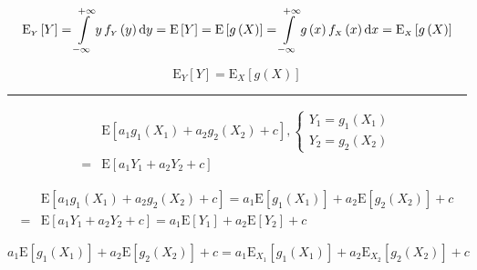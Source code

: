 \documentclass[
]{book}
\theoremstyle{definition}
\theoremstyle{definition}
\theoremstyle{definition}
\theoremstyle{definition}
\theoremstyle{remark}
\begin{document}
\[
\mathrm{E}_{{\scriptscriptstyle Y}}\left[Y\right]=\intop\limits _{-\infty}^{+\infty}y\thinspace f_{{\scriptscriptstyle Y}}\left(y\right)\mathrm{d}y=\mathrm{E}\left[Y\right]=\mathrm{E}\left[g\left(X\right)\right]=\intop\limits _{-\infty}^{+\infty}g\left(x\right)f_{{\scriptscriptstyle X}}\left(x\right)\mathrm{d}x=\mathrm{E}_{{\scriptscriptstyle X}}\left[g\left(X\right)\right]
\]

\[
\mathrm{E}_{{\scriptscriptstyle Y}}\left[Y\right]=\mathrm{E}_{{\scriptscriptstyle X}}\left[g\left(X\right)\right]
\]

\begin{center}\rule{0.5\linewidth}{0.5pt}\end{center}

\[
\begin{aligned}
 & \mathrm{E}\left[a_{{\scriptscriptstyle 1}}g_{{\scriptscriptstyle 1}}\left(X_{{\scriptscriptstyle 1}}\right)+a_{{\scriptscriptstyle 2}}g_{{\scriptscriptstyle 2}}\left(X_{{\scriptscriptstyle 2}}\right)+c\right],\begin{cases}
Y_{{\scriptscriptstyle 1}}=g_{{\scriptscriptstyle 1}}\left(X_{{\scriptscriptstyle 1}}\right)\\
Y_{{\scriptscriptstyle 2}}=g_{{\scriptscriptstyle 2}}\left(X_{{\scriptscriptstyle 2}}\right)
\end{cases}\\
= & \mathrm{E}\left[a_{{\scriptscriptstyle 1}}Y_{{\scriptscriptstyle 1}}+a_{{\scriptscriptstyle 2}}Y_{{\scriptscriptstyle 2}}+c\right]
\end{aligned}
\]

\[
\begin{aligned}
 & \mathrm{E}\left[a_{{\scriptscriptstyle 1}}g_{{\scriptscriptstyle 1}}\left(X_{{\scriptscriptstyle 1}}\right)+a_{{\scriptscriptstyle 2}}g_{{\scriptscriptstyle 2}}\left(X_{{\scriptscriptstyle 2}}\right)+c\right]=a_{{\scriptscriptstyle 1}}\mathrm{E}\left[g_{{\scriptscriptstyle 1}}\left(X_{{\scriptscriptstyle 1}}\right)\right]+a_{{\scriptscriptstyle 2}}\mathrm{E}\left[g_{{\scriptscriptstyle 2}}\left(X_{{\scriptscriptstyle 2}}\right)\right]+c\\
= & \mathrm{E}\left[a_{{\scriptscriptstyle 1}}Y_{{\scriptscriptstyle 1}}+a_{{\scriptscriptstyle 2}}Y_{{\scriptscriptstyle 2}}+c\right]=a_{{\scriptscriptstyle 1}}\mathrm{E}\left[Y_{{\scriptscriptstyle 1}}\right]+a_{{\scriptscriptstyle 2}}\mathrm{E}\left[Y_{{\scriptscriptstyle 2}}\right]+c
\end{aligned}
\]

\[
a_{{\scriptscriptstyle 1}}\mathrm{E}\left[g_{{\scriptscriptstyle 1}}\left(X_{{\scriptscriptstyle 1}}\right)\right]+a_{{\scriptscriptstyle 2}}\mathrm{E}\left[g_{{\scriptscriptstyle 2}}\left(X_{{\scriptscriptstyle 2}}\right)\right]+c=a_{{\scriptscriptstyle 1}}\mathrm{E}_{{\scriptscriptstyle X_{{\scriptscriptstyle 1}}}}\left[g_{{\scriptscriptstyle 1}}\left(X_{{\scriptscriptstyle 1}}\right)\right]+a_{{\scriptscriptstyle 2}}\mathrm{E}_{{\scriptscriptstyle X_{{\scriptscriptstyle 2}}}}\left[g_{{\scriptscriptstyle 2}}\left(X_{{\scriptscriptstyle 2}}\right)\right]+c
\]
\end{document}
